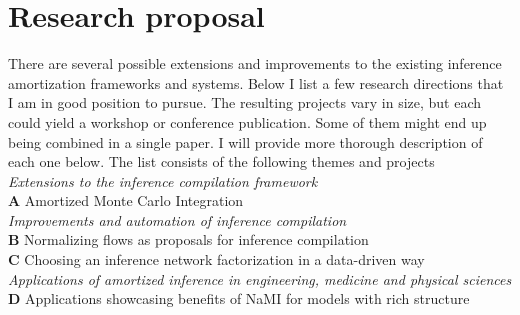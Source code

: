 \documentclass[12pt]{article}
\begin{document}
\section{Research proposal}
There are several possible extensions and improvements to the existing inference amortization frameworks and systems. 
Below I list a few research directions that I am in good position to pursue.
The resulting projects vary in size, but each could yield a workshop or conference publication.
Some of them might end up being combined in a single paper.
I will provide more thorough description of each one below.
The list consists of the following themes and projects\\
\emph{Extensions to the inference compilation framework}\\
\textbf{A} \quad Amortized Monte Carlo Integration\\
\emph{Improvements and automation of inference compilation}\\
\textbf{B} \quad Normalizing flows as proposals for inference compilation\\
\textbf{C} \quad Choosing an inference network factorization in a data-driven way\\
\emph{Applications of amortized inference in engineering, medicine and physical sciences}\\
\textbf{D} \quad Applications showcasing benefits of NaMI for models with rich structure\\
\end{document}

